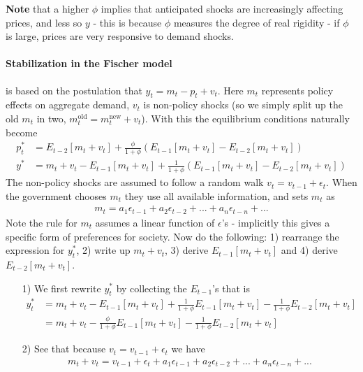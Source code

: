 \documentclass[12pt, a4paper]{article}
\begin{document}
\begin{spacing}{1.213}
\textbf{Note} that a higher $\phi$ implies that anticipated shocks are increasingly affecting prices, and less so $y$ - this is because $\phi$ measures the degree of real rigidity - if $\phi$ is large, prices are very responsive to demand shocks. 

\paragraph{Stabilization in the Fischer model}
is based on the postulation that $y_t = m_t - p_t + v_t$. Here $m_t$ represents policy effects on aggregate demand, $v_t$ is non-policy shocks (so we simply split up the old $m_t$ in two, $m_t^{\textrm{old}} = m_t^{\textrm{new}} + v_t$). With this the equilibrium conditions naturally become
\begin{align*}
p_t^* &= E_{t-2}[m_t + v_t] + \frac{\phi}{1+\phi} ( E_{t-1}[m_t + v_t] - E_{t-2}[m_t + v_t]) 
\\
y^* &= m_t + v_t - E_{t-1}[m_t + v_t] + \frac{1}{1+ \phi}(E_{t-1}[m_t+ v_t] -E_{t-2}[m_t+ v_t])
\end{align*}
The non-policy shocks are assumed to follow a random walk $v_t = v_{t-1} + \epsilon_t$. When the government chooses $m_t$ they use all available information, and sets $m_t$ as 
\begin{align*}
m_t = a_1 \epsilon_{t-1} + a_2 \epsilon_{t-2} + ... + a_{n} \epsilon_{t-n} + ... 
\end{align*}
Note the rule for $m_t$ assumes a linear function of $\epsilon$'s - implicitly this gives a specific form of preferences for society. Now do the following: 1) rearrange the expression for $y^*_t$, 2) write up $m_t+v_t$, 3) derive $E_{t-1}[m_t + v_t]$ and 4) derive $E_{t-2}[m_t + v_t]$.

\begin{itemize}
\item[1)] We first rewrite $y_t^*$ by collecting the $E_{t-1}$'s that is 
\begin{align*}
y_t^* &= m_t + v_t - E_{t-1}[m_t + v_t] + \frac{1}{1+ \phi}E_{t-1}[m_t+ v_t] - \frac{1}{1+ \phi}E_{t-2}[m_t+ v_t] \\
&= m_t + v_t - \frac{\phi}{1+ \phi} E_{t-1}[m_t + v_t] - \frac{1}{1+ \phi} E_{t-2}[m_t + v_t]
\end{align*}

\item[2)] See that because $v_t = v_{t-1} + \epsilon_t$ we have
\begin{align*}
m_t + v_t = v_{t-1} + \epsilon_t + a_1 \epsilon_{t-1} + a_2 \epsilon_{t-2} + ... + a_{n} \epsilon_{t-n} + ...
\end{align*}


\end{itemize}
\end{spacing}
\end{document}
